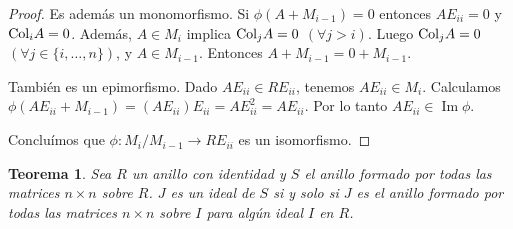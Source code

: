 \documentclass{report}
\newcommand{\Col}{\textnormal{Col}}
\DeclareMathOperator{\image}{\text{Im}}
\newtheorem{theorem}{Teorema}
\begin{document}
\begin{proof}
    Es además un monomorfismo.
    Si \(\phi(A + M_{i - 1}) = 0\) entonces \(A E_{i i} = 0\) y \(\Col_i A = 0\).
    Además, \(A \in M_i\) implica \(\Col_j A = 0\) \((\forall j > i)\).
    Luego \(\Col_j A = 0\) \((\forall j \in \{i, \dots, n\})\), y \(A \in M_{i - 1}\).
    Entonces \(A + M_{i - 1} = 0 + M_{i - 1}\).

    También es un epimorfismo.
    Dado \(A E_{i i} \in R E_{i i}\), tenemos \(A E_{i i} \in M_i\).
    Calculamos \(\phi(A E_{i i} + M_{i - 1})= (A E_{i i}) E_{i i} = A E_{i i}^2 = A E_{i i}\).
    Por lo tanto \(A E_{i i} \in \image \phi\).

    Concluímos que \(\phi : M_i / M_{i - 1} \rightarrow R E_{i i}\) es un isomorfismo.
  \end{proof}

  \begin{theorem}
    Sea \(R\) un anillo con identidad y \(S\) el anillo formado por todas las matrices \(n \times n\) sobre \(R\).
    \(J\) es un ideal de \(S\) si y solo si \(J\) es el anillo formado por todas las matrices \(n \times n\) sobre \(I\) para algún ideal \(I\) en \(R\).
  \end{theorem}
\end{document}
